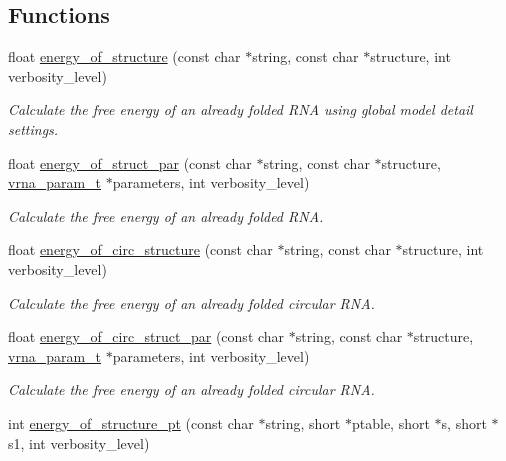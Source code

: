 \subsection*{Functions}
\begin{DoxyCompactItemize}
\item 
float \hyperlink{group__eval__deprecated_gaf93986cb3cb29770ec9cca69c9fab8cf}{energy\+\_\+of\+\_\+structure} (const char $\ast$string, const char $\ast$structure, int verbosity\+\_\+level)
\begin{DoxyCompactList}\small\item\em Calculate the free energy of an already folded R\+NA using global model detail settings. \end{DoxyCompactList}\item 
float \hyperlink{group__eval__deprecated_gaf9d064d3c496de42eca6734a96fd2090}{energy\+\_\+of\+\_\+struct\+\_\+par} (const char $\ast$string, const char $\ast$structure, \hyperlink{group__energy__parameters_ga8a69ca7d787e4fd6079914f5343a1f35}{vrna\+\_\+param\+\_\+t} $\ast$parameters, int verbosity\+\_\+level)
\begin{DoxyCompactList}\small\item\em Calculate the free energy of an already folded R\+NA. \end{DoxyCompactList}\item 
float \hyperlink{group__eval__deprecated_gaeb14f3664aec67fc03268ac75253f0f8}{energy\+\_\+of\+\_\+circ\+\_\+structure} (const char $\ast$string, const char $\ast$structure, int verbosity\+\_\+level)
\begin{DoxyCompactList}\small\item\em Calculate the free energy of an already folded circular R\+NA. \end{DoxyCompactList}\item 
float \hyperlink{group__eval__deprecated_ga3f01f9744ba6a40555eb4d81fc77f6df}{energy\+\_\+of\+\_\+circ\+\_\+struct\+\_\+par} (const char $\ast$string, const char $\ast$structure, \hyperlink{group__energy__parameters_ga8a69ca7d787e4fd6079914f5343a1f35}{vrna\+\_\+param\+\_\+t} $\ast$parameters, int verbosity\+\_\+level)
\begin{DoxyCompactList}\small\item\em Calculate the free energy of an already folded circular R\+NA. \end{DoxyCompactList}\item 
int \hyperlink{group__eval__deprecated_ga8831445966b761417e713360791299d8}{energy\+\_\+of\+\_\+structure\+\_\+pt} (const char $\ast$string, short $\ast$ptable, short $\ast$s, short $\ast$s1, int verbosity\+\_\+level)

\end{DoxyCompactItemize}
